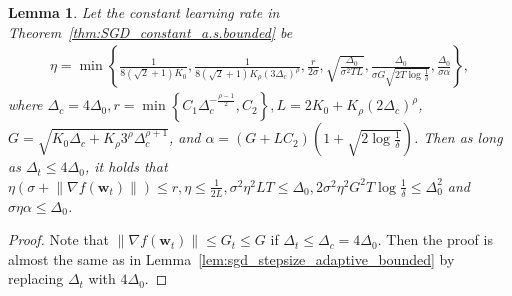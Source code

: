 \documentclass{article}
\newtheorem{lemma}{Lemma}
\newcommand{\Norm}[1]{\left\|#1\right\|}
\newcommand{\Kr}{K_{\rho}}
\newcommand{\paren}[1]{\left( #1 \right)}
\newcommand{\bw}{\mathbf{w}}
\begin{document}
\begin{lemma}\label{lem:sgd_stepsize_constant_bounded}
    Let the constant learning rate in Theorem~\ref{thm:SGD_constant_a.s.bounded} be
    \begin{align*}
        \eta=\min\left\{\frac{1}{8(\sqrt{2}+1)K_0},\frac{1}{8\paren{\sqrt{2}+1}\Kr\paren{3\Delta_c}^{\rho}},\frac{r}{2\sigma},\sqrt{\frac{\Delta_0}{\sigma^2TL}}, \frac{\Delta_0}{\sigma G\sqrt{2T\log\frac{1}{\delta}}}, \frac{\Delta_0}{\sigma\alpha}\right\},
    \end{align*}
    where $\Delta_c=4\Delta_0, r=\min\left\{C_1\Delta_c^{-\frac{\rho-1}{2}}, C_2\right\},L=2K_0+\Kr\paren{2\Delta_c}^\rho$,  $G=\sqrt{K_0\Delta_c+\Kr 3^\rho\Delta_c^{\rho+1}}$, and 
    $\alpha=\paren{G+LC_2}\paren{1+\sqrt{2\log\frac{1}{\delta}}}$.
    Then as long as $\Delta_t\leq 4\Delta_0$, it holds that 
    $\eta\paren{\sigma+\Norm{\nabla f(\bw_t)}}\leq r, \eta\leq\frac{1}{2L}, \sigma^2\eta^2LT\leq\Delta_0, 2\sigma^2\eta^2G^2T\log\frac{1}{\delta}\leq\Delta_0^2$ and $\sigma\eta \alpha\leq\Delta_0$.

\end{lemma}
\begin{proof}
    Note that $\Norm{\nabla f(\bw_t)}\leq G_t\leq G$ if $\Delta_t\leq\Delta_c=4\Delta_0$. Then 
    the proof is almost the same as in Lemma~\ref{lem:sgd_stepsize_adaptive_bounded} by replacing  $\Delta_t$ with $4\Delta_0$.
\end{proof}
    
\end{document}
